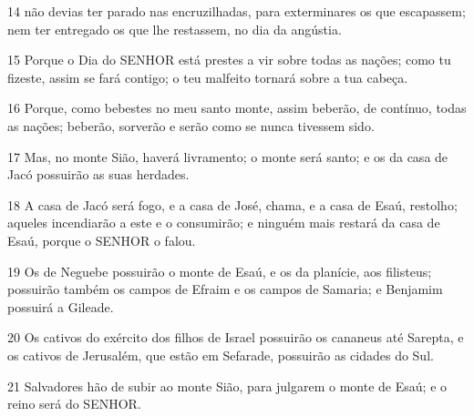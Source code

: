 \par 14 não devias ter parado nas encruzilhadas, para exterminares os que escapassem; nem ter entregado os que lhe restassem, no dia da angústia.
\par 15 Porque o Dia do SENHOR está prestes a vir sobre todas as nações; como tu fizeste, assim se fará contigo; o teu malfeito tornará sobre a tua cabeça.
\par 16 Porque, como bebestes no meu santo monte, assim beberão, de contínuo, todas as nações; beberão, sorverão e serão como se nunca tivessem sido.
\par 17 Mas, no monte Sião, haverá livramento; o monte será santo; e os da casa de Jacó possuirão as suas herdades.
\par 18 A casa de Jacó será fogo, e a casa de José, chama, e a casa de Esaú, restolho; aqueles incendiarão a este e o consumirão; e ninguém mais restará da casa de Esaú, porque o SENHOR o falou.
\par 19 Os de Neguebe possuirão o monte de Esaú, e os da planície, aos filisteus; possuirão também os campos de Efraim e os campos de Samaria; e Benjamim possuirá a Gileade.
\par 20 Os cativos do exército dos filhos de Israel possuirão os cananeus até Sarepta, e os cativos de Jerusalém, que estão em Sefarade, possuirão as cidades do Sul.
\par 21 Salvadores hão de subir ao monte Sião, para julgarem o monte de Esaú; e o reino será do SENHOR.


